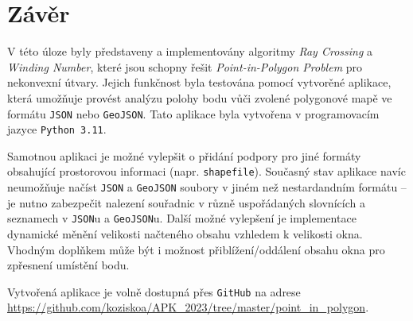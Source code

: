 \chapter*{Závěr}

\par V této úloze byly představeny a implementovány algoritmy \emph{Ray Crossing} a \emph{Winding Number}, které jsou schopny řešit \emph{Point-in-Polygon Problem} pro nekonvexní útvary. Jejich funkčnost byla testována pomocí vytvorěné aplikace, která umožňuje provést analýzu polohy bodu vůči zvolené polygonové mapě ve formátu \verb|JSON| nebo \verb|GeoJSON|. Tato aplikace byla vytvořena v programovacím jazyce \verb|Python 3.11|.
\par Samotnou aplikaci je možné vylepšit o přidání podpory pro jiné formáty obsahující prostorovou informaci (napr. \verb|shapefile|). Současný stav aplikace navíc neumožňuje načíst \verb|JSON| a \verb|GeoJSON| soubory v jiném než nestardandním formátu – je nutno zabezpečit nalezení souřadnic v různě uspořádaných slovnících a seznamech v \verb|JSON|u a \verb|GeoJSON|u. Další možné vylepšení je implementace dynamické měnění velikosti načteného obsahu vzhledem k velikosti okna. Vhodným doplňkem může být i možnost přiblížení/oddálení obsahu okna pro zpřesnení umístění bodu.
\par Vytvořená aplikace je volně dostupná přes \verb|GitHub| na adrese \url{https://github.com/koziskoa/APK_2023/tree/master/point_in_polygon}.
